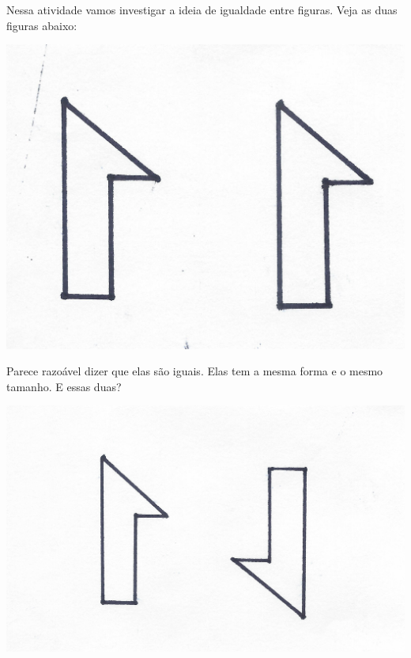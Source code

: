 \documentclass[twoside, 12pt]{article}
\begin{document}

Nessa atividade vamos investigar a ideia de igualdade entre figuras.
Veja as duas figuras abaixo:

\begin{center}
  \includegraphics[height=0.2\textheight]{img/03-1}
\end{center}

Parece razoável dizer que elas são iguais. Elas tem a mesma forma e o
mesmo tamanho. E essas duas?

\begin{center}
  \includegraphics[height=0.2\textheight]{img/03-2}
\end{center}
\end{document}
